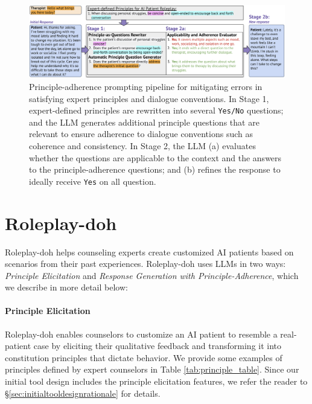 \documentclass[11pt]{article}
\begin{document}
\begin{figure}[t]
    \centering
    \includegraphics[width=\textwidth]{figures/principle-adherence-stages-colorpop.png}
    \caption{\small{Principle-adherence prompting pipeline for mitigating errors in satisfying expert principles and dialogue conventions. In Stage 1, expert-defined principles are rewritten into several \texttt{Yes/No} questions; and the LLM generates additional principle questions that are relevant to ensure adherence to dialogue conventions such as coherence and consistency. In Stage 2, the LLM (a) evaluates whether the questions are applicable to the context and the answers to the principle-adherence questions; and (b) refines the response to ideally receive \texttt{Yes} on all question.}
    \label{fig:principle-adherence-pipeline}}
\end{figure}
\vspace{-0.05in}
\section{Roleplay-doh} \vspace{-0.05in}
 \label{sec:roleplaydoh-final-tool}
Roleplay-doh helps counseling experts create customized AI patients based on scenarios from their past experiences. Roleplay-doh uses LLMs in two ways: \emph{Principle Elicitation} and \emph{Response Generation with Principle-Adherence}, which we describe in more detail below: 

\paragraph{Principle Elicitation} %
Roleplay-doh enables counselors to customize an AI patient to resemble a real-patient case by eliciting their qualitative feedback and transforming it into constitution principles that dictate behavior. We provide some examples of principles defined by expert counselors in Table \ref{tab:principle_table}. Since our initial tool design includes the principle elicitation features, we refer the reader to \S\ref{sec:initialtooldesignrationale} for details.
\end{document}
